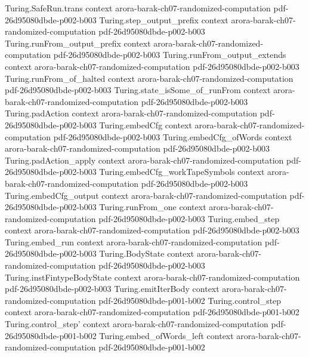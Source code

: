 \begin{theorem}
  {Turing.SafeRun.trans}
  {context}
  {arora-barak-ch07-randomized-computation}
  {pdf-26d95080dbde-p002-b003}
\proofstep
  {Turing.step_output_prefix}
  {context}
  {arora-barak-ch07-randomized-computation}
  {pdf-26d95080dbde-p002-b003}
\proofstep
  {Turing.runFrom_output_prefix}
  {context}
  {arora-barak-ch07-randomized-computation}
  {pdf-26d95080dbde-p002-b003}
\proofstep
  {Turing.runFrom_output_extends}
  {context}
  {arora-barak-ch07-randomized-computation}
  {pdf-26d95080dbde-p002-b003}
\proofstep
  {Turing.runFrom_of_halted}
  {context}
  {arora-barak-ch07-randomized-computation}
  {pdf-26d95080dbde-p002-b003}
\proofstep
  {Turing.state_isSome_of_runFrom}
  {context}
  {arora-barak-ch07-randomized-computation}
  {pdf-26d95080dbde-p002-b003}
\proofstep
  {Turing.padAction}
  {context}
  {arora-barak-ch07-randomized-computation}
  {pdf-26d95080dbde-p002-b003}
\proofstep
  {Turing.embedCfg}
  {context}
  {arora-barak-ch07-randomized-computation}
  {pdf-26d95080dbde-p002-b003}
\proofstep
  {Turing.embedCfg_ofWords}
  {context}
  {arora-barak-ch07-randomized-computation}
  {pdf-26d95080dbde-p002-b003}
\proofstep
  {Turing.padAction_apply}
  {context}
  {arora-barak-ch07-randomized-computation}
  {pdf-26d95080dbde-p002-b003}
\proofstep
  {Turing.embedCfg_workTapeSymbols}
  {context}
  {arora-barak-ch07-randomized-computation}
  {pdf-26d95080dbde-p002-b003}
\proofstep
  {Turing.embedCfg_output}
  {context}
  {arora-barak-ch07-randomized-computation}
  {pdf-26d95080dbde-p002-b003}
\proofstep
  {Turing.runFrom_one}
  {context}
  {arora-barak-ch07-randomized-computation}
  {pdf-26d95080dbde-p002-b003}
\proofstep
  {Turing.embed_step}
  {context}
  {arora-barak-ch07-randomized-computation}
  {pdf-26d95080dbde-p002-b003}
\proofstep
  {Turing.embed_run}
  {context}
  {arora-barak-ch07-randomized-computation}
  {pdf-26d95080dbde-p002-b003}
\proofstep
  {Turing.BodyState}
  {context}
  {arora-barak-ch07-randomized-computation}
  {pdf-26d95080dbde-p002-b003}
\proofstep
  {Turing.instFintypeBodyState}
  {context}
  {arora-barak-ch07-randomized-computation}
  {pdf-26d95080dbde-p002-b003}
\proofstep
  {Turing.emitIterBody}
  {context}
  {arora-barak-ch07-randomized-computation}
  {pdf-26d95080dbde-p001-b002}
\proofstep
  {Turing.control_step}
  {context}
  {arora-barak-ch07-randomized-computation}
  {pdf-26d95080dbde-p001-b002}
\proofstep
  {Turing.control_step'}
  {context}
  {arora-barak-ch07-randomized-computation}
  {pdf-26d95080dbde-p001-b002}
\proofstep
  {Turing.embed_ofWords_left}
  {context}
  {arora-barak-ch07-randomized-computation}
  {pdf-26d95080dbde-p001-b002}

\end{theorem}

